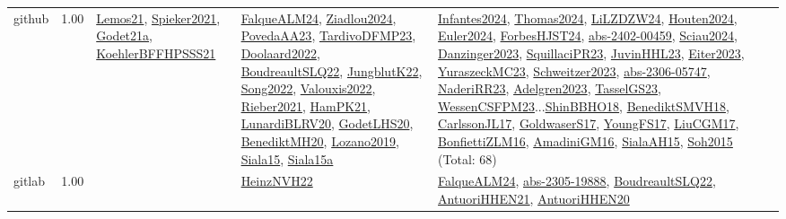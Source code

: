 {\begin{longtable}{p{3cm}r>{\raggedright\arraybackslash}p{6cm}>{\raggedright\arraybackslash}p{6cm}>{\raggedright\arraybackslash}p{8cm}}
\index{github}\index{Benchmarks!github}github &  1.00 & \hyperref[detail:Lemos21]{Lemos21}, \hyperref[detail:Spieker2021]{Spieker2021}, \hyperref[detail:Godet21a]{Godet21a}, \hyperref[detail:KoehlerBFFHPSSS21]{KoehlerBFFHPSSS21} & \hyperref[detail:FalqueALM24]{FalqueALM24}, \hyperref[detail:Ziadlou2024]{Ziadlou2024}, \hyperref[detail:PovedaAA23]{PovedaAA23}, \hyperref[detail:TardivoDFMP23]{TardivoDFMP23}, \hyperref[detail:Doolaard2022]{Doolaard2022}, \hyperref[detail:BoudreaultSLQ22]{BoudreaultSLQ22}, \hyperref[detail:JungblutK22]{JungblutK22}, \hyperref[detail:Song2022]{Song2022}, \hyperref[detail:Valouxis2022]{Valouxis2022}, \hyperref[detail:Rieber2021]{Rieber2021}, \hyperref[detail:HamPK21]{HamPK21}, \hyperref[detail:LunardiBLRV20]{LunardiBLRV20}, \hyperref[detail:GodetLHS20]{GodetLHS20}, \hyperref[detail:BenediktMH20]{BenediktMH20}, \hyperref[detail:Lozano2019]{Lozano2019}, \hyperref[detail:Siala15]{Siala15}, \hyperref[detail:Siala15a]{Siala15a} & \hyperref[detail:Infantes2024]{Infantes2024}, \hyperref[detail:Thomas2024]{Thomas2024}, \hyperref[detail:LiLZDZW24]{LiLZDZW24}, \hyperref[detail:Houten2024]{Houten2024}, \hyperref[detail:Euler2024]{Euler2024}, \hyperref[detail:ForbesHJST24]{ForbesHJST24}, \hyperref[detail:abs-2402-00459]{abs-2402-00459}, \hyperref[detail:Sciau2024]{Sciau2024}, \hyperref[detail:Danzinger2023]{Danzinger2023}, \hyperref[detail:SquillaciPR23]{SquillaciPR23}, \hyperref[detail:JuvinHHL23]{JuvinHHL23}, \hyperref[detail:Eiter2023]{Eiter2023}, \hyperref[detail:YuraszeckMC23]{YuraszeckMC23}, \hyperref[detail:Schweitzer2023]{Schweitzer2023}, \hyperref[detail:abs-2306-05747]{abs-2306-05747}, \hyperref[detail:NaderiRR23]{NaderiRR23}, \hyperref[detail:Adelgren2023]{Adelgren2023}, \hyperref[detail:TasselGS23]{TasselGS23}, \hyperref[detail:WessenCSFPM23]{WessenCSFPM23}...\hyperref[detail:ShinBBHO18]{ShinBBHO18}, \hyperref[detail:BenediktSMVH18]{BenediktSMVH18}, \hyperref[detail:CarlssonJL17]{CarlssonJL17}, \hyperref[detail:GoldwaserS17]{GoldwaserS17}, \hyperref[detail:YoungFS17]{YoungFS17}, \hyperref[detail:LiuCGM17]{LiuCGM17}, \hyperref[detail:BonfiettiZLM16]{BonfiettiZLM16}, \hyperref[detail:AmadiniGM16]{AmadiniGM16}, \hyperref[detail:SialaAH15]{SialaAH15}, \hyperref[detail:Soh2015]{Soh2015} (Total: 68)\\
\index{gitlab}\index{Benchmarks!gitlab}gitlab &  1.00 &  & \hyperref[detail:HeinzNVH22]{HeinzNVH22} & \hyperref[detail:FalqueALM24]{FalqueALM24}, \hyperref[detail:abs-2305-19888]{abs-2305-19888}, \hyperref[detail:BoudreaultSLQ22]{BoudreaultSLQ22}, \hyperref[detail:AntuoriHHEN21]{AntuoriHHEN21}, \hyperref[detail:AntuoriHHEN20]{AntuoriHHEN20}\\

\end{longtable}}

